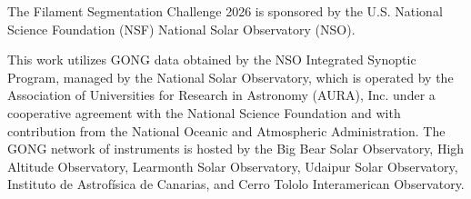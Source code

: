 \documentclass[sigconf]{acmart}
\begin{document}
    The Filament Segmentation Challenge 2026 is sponsored by the U.S. National Science Foundation (NSF) National Solar Observatory (NSO).

    This work utilizes GONG data obtained by the NSO Integrated Synoptic Program, managed by the National Solar Observatory, which is operated by the Association of Universities for Research in Astronomy (AURA), Inc. under a cooperative agreement with the National Science Foundation and with contribution from the National Oceanic and Atmospheric Administration. The GONG network of instruments is hosted by the Big Bear Solar Observatory, High Altitude Observatory, Learmonth Solar Observatory, Udaipur Solar Observatory, Instituto de Astrofísica de Canarias, and Cerro Tololo Interamerican Observatory.



\end{document}
